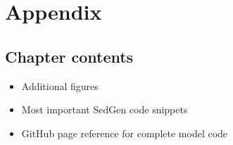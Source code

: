 \chapter{Appendix}\label{ch:myappendix}

\section{Chapter contents}
\begin{itemize}
    \item Additional figures
    \item Most important SedGen code snippets
    \item GitHub page reference for complete model code

\end{itemize}

\instructionsappendices


\cleardoublepage

